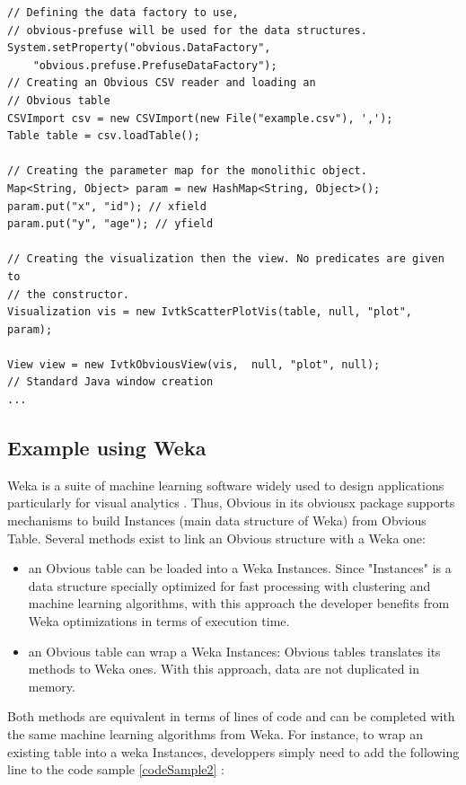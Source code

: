 \begin{lstlisting}[caption={Combining different Obvious implementations to display a scatter-plot},label=codeSample2]
// Defining the data factory to use,
// obvious-prefuse will be used for the data structures.
System.setProperty("obvious.DataFactory",
    "obvious.prefuse.PrefuseDataFactory");
// Creating an Obvious CSV reader and loading an
// Obvious table
CSVImport csv = new CSVImport(new File("example.csv"), ',');
Table table = csv.loadTable();

// Creating the parameter map for the monolithic object.
Map<String, Object> param = new HashMap<String, Object>();
param.put("x", "id"); // xfield
param.put("y", "age"); // yfield

// Creating the visualization then the view. No predicates are given to
// the constructor.
Visualization vis = new IvtkScatterPlotVis(table, null, "plot", param);

View view = new IvtkObviousView(vis,  null, "plot", null);
// Standard Java window creation
...
\end{lstlisting}

\subsection{Example using Weka}

Weka \cite{Weka} is a suite of machine learning software widely used to design applications particularly for visual analytics . Thus, Obvious in its obviousx package supports mechanisms to build Instances (main data structure of Weka) from Obvious Table. Several methods exist to link an Obvious structure with a Weka one:

\begin{itemize}
\item an Obvious table can be loaded into a Weka Instances. Since "Instances" is a data structure specially optimized for fast processing with clustering and machine learning algorithms, with this approach the developer benefits from Weka optimizations in terms of execution time.
\item an Obvious table can wrap a Weka Instances: Obvious tables translates its methods to Weka ones. With this approach, data are not duplicated in memory.
\end{itemize}

Both methods are equivalent in terms of lines of code and can be completed with the same machine learning algorithms from Weka. For instance, to wrap an existing table into a weka Instances, developpers simply need to add the following line to the code sample \ref{codeSample2} :

